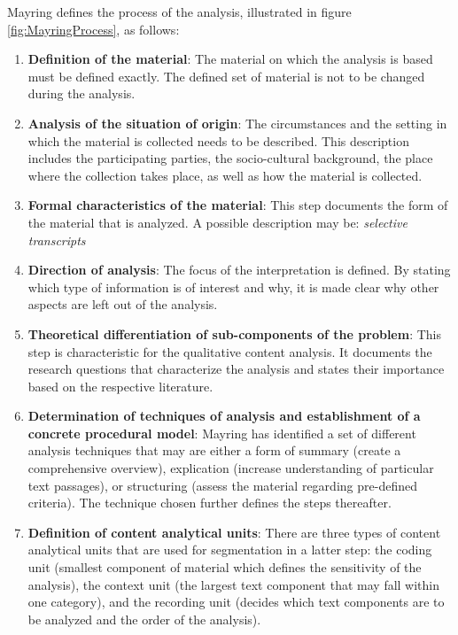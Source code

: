 
 \label{anhang:QualitativeContentAnalysis}

Mayring defines the process of the analysis, illustrated in figure \ref{fig:MayringProcess}, as follows: 
\begin{enumerate}
    \item \textbf{Definition of the material}: The material on which the analysis is based must be defined exactly. The defined set of material is not to be changed during the analysis.
    \item \textbf{Analysis of the situation of origin}: The circumstances and the setting in which the material is collected needs to be described. This description includes the participating parties, the socio-cultural background, the place where the collection takes place, as well as how the material is collected.
    \item \textbf{Formal characteristics of the material}: This step documents the form of the material that is analyzed. A possible description may be: \textit{selective transcripts}
    \item \textbf{Direction of analysis}: The focus of the interpretation is defined. By stating which type of information is of interest and why, it is made clear why other aspects are left out of the analysis.
    \item \textbf{Theoretical differentiation of sub-components of the problem}: This step is characteristic for the qualitative content analysis. It documents the research questions that characterize the analysis and states their importance based on the respective literature.
    \item \textbf{Determination of techniques of analysis and establishment of a concrete procedural model}: Mayring has identified a set of different analysis techniques that may are either a form of summary (create a comprehensive overview), explication (increase understanding of particular text passages), or structuring (assess the material regarding pre-defined criteria). The technique chosen further defines the steps thereafter.
    \item \textbf{Definition of content analytical units}: There are three types of content analytical units that are used for segmentation in a latter step: the coding unit (smallest component of material which defines the sensitivity of the analysis), the context unit (the largest text component that may fall within one category), and the recording unit (decides which text components are to be analyzed and the order of the analysis).

\end{enumerate}
